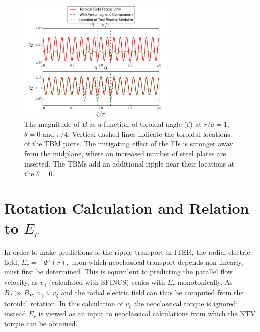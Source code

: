\documentclass{article}
\begin{document}
\begin{figure}[h!]
\centering
\includegraphics[width=0.7\textwidth]{toroidalripple.png}
\caption{\label{fig:toroidalripple} The magnitude of $B$ as a function of toroidal angle ($\zeta$) at $r/a = 1$, $\theta = 0$ and $\pi/4$. Vertical dashed lines indicate the toroidal locations of the TBM ports. The mitigating effect of the FIs is stronger away from the midplane, where an increased number of steel plates are inserted. The TBMs add an additional ripple near their locations at the $\theta = 0$. }
\end{figure}

\FloatBarrier

\section{Rotation Calculation and Relation to $E_r$}\label{rotation}

In order to make predictions of the ripple transport in ITER, the radial electric field, $E_r = - \Phi'(r) $, upon which neoclassical transport depends non-linearly, must first be determined. This is equivalent to predicting the parallel flow velocity, as $v_{||}$ (calculated with SFINCS) scales with $E_r$ monotonically. As $B_T \gg B_P$, $v_{||} \approx v_{\zeta}$ and the radial electric field can thus be computed from the toroidal rotation. In this calculation of $v_{\zeta}$ the neoclassical torque is ignored: instead $E_r$ is viewed as an input to neoclassical calculations from which the NTV torque can be obtained. 
\end{document}
